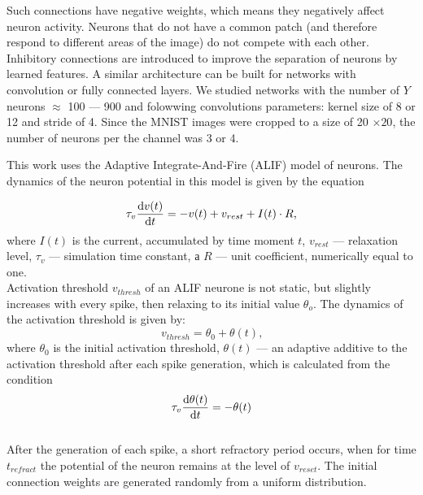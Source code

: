 \documentclass[a4paper,10pt]{article}
\begin{document}
Such connections have negative weights, which means they negatively affect neuron activity. Neurons that do not have a common patch (and therefore respond to different areas of the image) do not compete with each other. Inhibitory connections are introduced to improve the separation of neurons by learned features. A similar architecture can be built for networks with convolution or fully connected layers. We studied networks with the number of $Y$ neurons $\approx$ 100 --- 900 and folowwing convolutions parameters: kernel size of 8 or 12 and stride of 4. Since the MNIST images were cropped to a size of 20 $\times 20$, the number of neurons per the channel was 3 or 4.

This work uses the Adaptive Integrate-And-Fire (ALIF) model of neurons. The dynamics of the neuron potential in this model is given by the equation

\begin{equation} \label{eq:alif}
 \tau_v \dv{v(t)}{t} = -v(t) + v_{rest} + I(t) \cdot R \text{,}
\end{equation} where $I(t)$ is the current, accumulated by time moment $t$, $v_{rest}$ --- relaxation level, $\tau_v$ --- simulation time constant, а $R$ --- unit coefficient, numerically equal to one.\\ 

Activation threshold $v_{thresh}$ of an ALIF neurone is not static, but slightly increases with every spike, then relaxing to its initial value $\theta_o$. The dynamics of the activation threshold is given by:
\begin{equation} 
 v_{thresh} = \theta_0 + \theta(t) \text{,}
\end{equation} where $\theta_0$ is the initial activation threshold, $\theta(t)$ --- an adaptive additive to the activation threshold after each spike generation, which is calculated from the condition\\

\begin{equation}
 \tau_v \dv{\theta(t)}{t} = -\theta(t)
\end{equation}\\

After the generation of each spike, a short refractory period occurs, when for time $t_{refract}$ the potential of the neuron remains at the level of $v_{reset}$. The initial connection weights are generated randomly from a uniform distribution.
\end{document}
